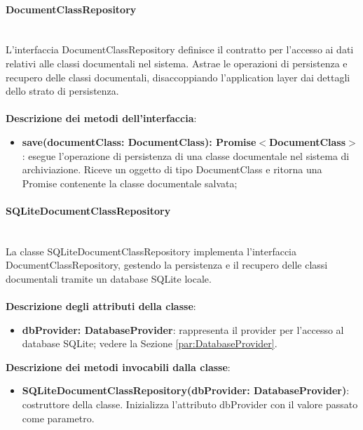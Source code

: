 \documentclass[a4paper,12pt]{article}
\begin{document}
                \paragraph{DocumentClassRepository}\label{par:DocumentClassRepository}\mbox{}\\
                L'interfaccia DocumentClassRepository definisce il contratto per l'accesso ai dati relativi alle classi documentali nel sistema. Astrae le operazioni di persistenza e recupero delle classi documentali, disaccoppiando l'application layer dai dettagli dello strato di persistenza.\\
                \\
              \noindent \textbf{Descrizione dei metodi dell'interfaccia}:
                \begin{itemize}
                    \item \textbf{save(documentClass: DocumentClass): Promise$<$DocumentClass$>$}: esegue l'operazione di persistenza di una classe documentale nel sistema di archiviazione. Riceve un oggetto di tipo DocumentClass e ritorna una Promise contenente la classe documentale salvata;
                \end{itemize}

                \paragraph{SQLiteDocumentClassRepository}\label{par:SQLiteDocumentClassRepository}\mbox{}\\
                La classe SQLiteDocumentClassRepository implementa l'interfaccia DocumentClassRepository, gestendo la persistenza e il recupero delle classi documentali tramite un database SQLite locale.\\
                \\
                \textbf{Descrizione degli attributi della classe}:
                \begin{itemize}
                    \item \textbf{dbProvider: DatabaseProvider}: rappresenta il provider per l'accesso al database SQLite; vedere la Sezione \ref{par:DatabaseProvider}.
                \end{itemize}
 
              \noindent \textbf{Descrizione dei metodi invocabili dalla classe}:
                \begin{itemize}
                    \item \textbf{SQLiteDocumentClassRepository(dbProvider: DatabaseProvider)}: costruttore della classe. Inizializza l'attributo dbProvider con il valore passato come parametro.
                \end{itemize}
\end{document}
